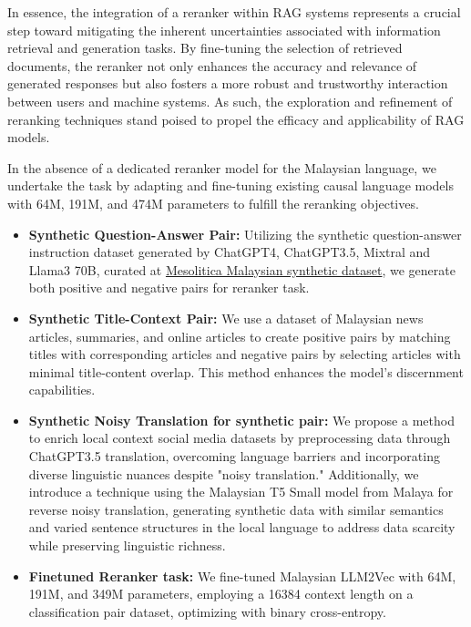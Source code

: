 \documentclass[preprint]{article}
\begin{document}
In essence, the integration of a reranker within RAG systems represents a crucial step toward mitigating the inherent uncertainties associated with information retrieval and generation tasks. By fine-tuning the selection of retrieved documents, the reranker not only enhances the accuracy and relevance of generated responses but also fosters a more robust and trustworthy interaction between users and machine systems. As such, the exploration and refinement of reranking techniques stand poised to propel the efficacy and applicability of RAG models.

In the absence of a dedicated reranker model for the Malaysian language, we undertake the task by adapting and fine-tuning existing causal language models with 64M, 191M, and 474M parameters to fulfill the reranking objectives.

\begin{itemize}

  \item \textbf{Synthetic Question-Answer Pair:} Utilizing the synthetic question-answer instruction dataset generated by ChatGPT4, ChatGPT3.5, Mixtral and Llama3 70B, curated at \href{https://huggingface.co/collections/mesolitica/malaysian-synthetic-dataset-656c2673fe7fe0b1e9e25fe2}{Mesolitica Malaysian synthetic dataset}, we generate both positive and negative pairs for reranker task.

  \item \textbf{Synthetic Title-Context Pair:}  We use a dataset of Malaysian news articles, summaries, and online articles to create positive pairs by matching titles with corresponding articles and negative pairs by selecting articles with minimal title-content overlap. This method enhances the model's discernment capabilities.

  \item \textbf{Synthetic Noisy Translation for synthetic pair:} We propose a method to enrich local context social media datasets by preprocessing data through ChatGPT3.5 translation, overcoming language barriers and incorporating diverse linguistic nuances despite "noisy translation." Additionally, we introduce a technique using the Malaysian T5 Small model from Malaya for reverse noisy translation, generating synthetic data with similar semantics and varied sentence structures in the local language to address data scarcity while preserving linguistic richness.

  \item \textbf{Finetuned Reranker task:} We fine-tuned Malaysian LLM2Vec \cite{behnamghader2024llm2veclargelanguagemodels} with 64M, 191M, and 349M parameters, employing a 16384 context length on a classification pair dataset, optimizing with binary cross-entropy.

\end{itemize}
\end{document}
